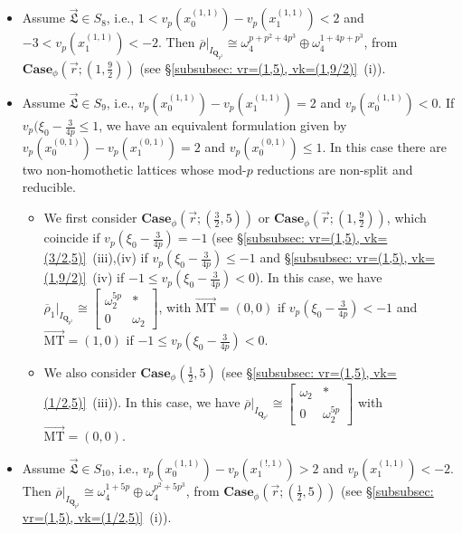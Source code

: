 \documentclass[11pt]{amsart}
\theoremstyle{definition}
\numberwithin{equation}{subsection}
\theoremstyle{plain}
\theoremstyle{plain}
\theoremstyle{plain}
\theoremstyle{plain}
\theoremstyle{plain}
\theoremstyle{plain}
\theoremstyle{plain}
\theoremstyle{plain}
\theoremstyle{plain}
\theoremstyle{plain}
\theoremstyle{plain}
\theoremstyle{plain}
\theoremstyle{definition}
\theoremstyle{definition}
\theoremstyle{definition}
\theoremstyle{remark}
\renewcommand{\(}{\textup{(}}
\renewcommand{\)}{\textup{)}}
\newcommand{\Q}{\mathbf{Q}}
\newcommand{\rhobar}{\overline{\rho}}
\newcommand{\fL}{\mathfrak{L}}
\newcommand{\vr}{\vec{r}}
\newcommand{\vL}{\vec{\fL}}
\newcommand{\IQptwo}{{I_{\Q_{p^2}}}}
\begin{document}
\begin{itemize}[leftmargin=*]
\item Assume $\vL\in S_8$, i.e., $1<v_p(x_0^{(1,1)})-v_p(x_1^{(1,1)})<2$ and $-3<v_p(x_1^{(1,1)})<-2$. Then $\rhobar|_\IQptwo\cong\omega_4^{p+p^2+4p^3}\oplus\omega_4^{1+4p+p^3}$, from $\mathbf{Case}_\phi(\vr;(1,\frac{9}{2}))$ (see \S\ref{subsubsec: vr=(1,5), vk=(1,9/2)}~(i)).

\item Assume $\vL\in S_9$, i.e., $v_p(x_0^{(1,1)})-v_p(x_1^{(1,1)})=2$ and $v_p(x_0^{(1,1)})<0$. If $v_p(\xi_0-\frac{3}{4p}\leq 1$, we have an equivalent formulation given by $v_p(x_0^{(0,1)})-v_p(x_1^{(0,1)})=2$ and $v_p(x_0^{(0,1)})\leq 1$. In this case there are two non-homothetic lattices whose mod-$p$ reductions are non-split and reducible.
\begin{itemize}[leftmargin=*]
    \item We first consider $\mathbf{Case}_\phi(\vr;(\frac{3}{2},5))$ or $\mathbf{Case}_\phi(\vr;(1,\frac{9}{2}))$, which coincide if $v_p(\xi_0-\frac{3}{4p})=-1$ (see \S\ref{subsubsec: vr=(1,5), vk=(3/2,5)}~(iii),(iv) if $v_p(\xi_0-\frac{3}{4p})\leq -1$ and \S\ref{subsubsec: vr=(1,5), vk=(1,9/2)}~(iv) if $-1\leq v_p(\xi_0-\frac{3}{4p})<0$). In this case, we have $\rhobar_1|_\IQptwo\cong
    \begin{bmatrix}
        \omega_2^{5p} & * \\ 0 & \omega_2
    \end{bmatrix}$, with $\vec{\mathrm{MT}}=(0,0)$ if $v_p(\xi_0-\frac{3}{4p})<-1$ and $\vec{\mathrm{MT}}=(1,0)$ if $-1\leq v_p(\xi_0-\frac{3}{4p})<0$.
    \item We also consider $\mathbf{Case}_\phi(\frac{1}{2},5)$ (see \S\ref{subsubsec: vr=(1,5), vk=(1/2,5)}~(iii)). In this case, we have $\rhobar|_\IQptwo\cong
    \begin{bmatrix}
        \omega_2 & * \\ 0 & \omega_2^{5p}
    \end{bmatrix}$ with $\vec{\mathrm{MT}}=(0,0)$.
\end{itemize}

\item Assume $\vL\in S_{10}$, i.e., $v_p(x_0^{(1,1)})-v_p(x_1^{(!,1)})>2$ and $v_p(x_1^{(1,1)})<-2$. Then $\rhobar|_\IQptwo\cong\omega_4^{1+5p}\oplus\omega_4^{p^2+5p^3}$, from $\mathbf{Case}_\phi(\vr;(\frac{1}{2},5))$ (see \S\ref{subsubsec: vr=(1,5), vk=(1/2,5)}~(i)).


\end{itemize}
\end{document}
